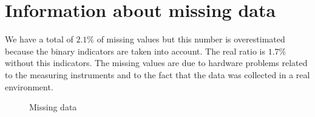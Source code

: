 \section{Information about missing data}
We have a total of $2.1\%$ of missing values but this number is overestimated because the binary indicators are taken into account. The real ratio is $1.7\%$
without this indicators.
The missing values are due to hardware problems related to the measuring instruments
and to the fact that the data was collected in a real environment.

\begin{figure}[H]
\centering

\caption{Missing data}
\label{fig:missing_data}
\end{figure}

